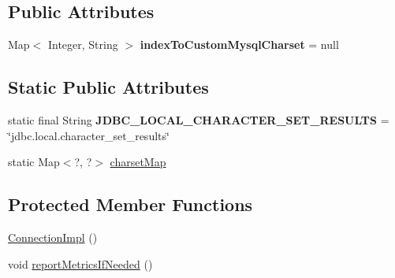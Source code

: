 \subsection*{Public Attributes}
\begin{DoxyCompactItemize}
\item 
\mbox{\label{classcom_1_1mysql_1_1jdbc_1_1_connection_impl_a7c1fc39188934953114e0c0873a3347f}} 
Map$<$ Integer, String $>$ {\bfseries index\+To\+Custom\+Mysql\+Charset} = null
\end{DoxyCompactItemize}
\subsection*{Static Public Attributes}
\begin{DoxyCompactItemize}
\item 
\mbox{\label{classcom_1_1mysql_1_1jdbc_1_1_connection_impl_a5d97a664aab37f523d5df076e137eeb5}} 
static final String {\bfseries J\+D\+B\+C\+\_\+\+L\+O\+C\+A\+L\+\_\+\+C\+H\+A\+R\+A\+C\+T\+E\+R\+\_\+\+S\+E\+T\+\_\+\+R\+E\+S\+U\+L\+TS} = \char`\"{}jdbc.\+local.\+character\+\_\+set\+\_\+results\char`\"{}
\item 
static Map$<$?, ?$>$ \mbox{\hyperlink{classcom_1_1mysql_1_1jdbc_1_1_connection_impl_a516ba1013c628f00d68091f6084e95e6}{charset\+Map}}
\end{DoxyCompactItemize}
\subsection*{Protected Member Functions}
\begin{DoxyCompactItemize}
\item 
\mbox{\hyperlink{classcom_1_1mysql_1_1jdbc_1_1_connection_impl_a3c11700ec151a1a13a2696b407161a34}{Connection\+Impl}} ()
\item 
void \mbox{\hyperlink{classcom_1_1mysql_1_1jdbc_1_1_connection_impl_a1a37a441754ebb5ba04461128442427a}{report\+Metrics\+If\+Needed}} ()
\end{DoxyCompactItemize}
